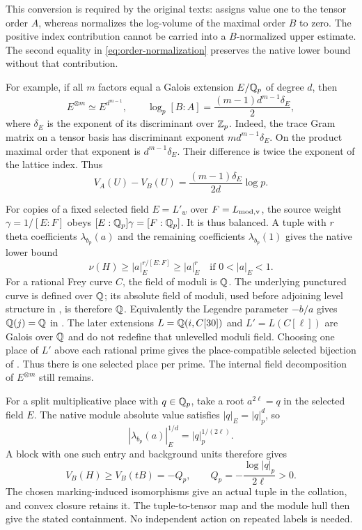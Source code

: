 This conversion is required by the original texts:
\cite[Section~9.10.3.1]{JoshiIII} assigns value one to the tensor order
$A$, whereas \cite[Proposition~1.4(i), author-version p.~13]{IUT4}
normalizes the log-volume of the maximal order $B$ to zero.
The positive index contribution cannot be carried into a $B$-normalized
upper estimate. The second equality in \eqref{eq:order-normalization}
preserves the native lower bound without that contribution.

For example, if all $m$ factors equal a Galois extension $E/\mathbb Q_p$ of
degree $d$, then
\[
 E^{\otimes m}\simeq E^{d^{m-1}},\qquad
 \log_p[B:A]=\frac{(m-1)d^{m-1}\delta_E}{2},
\]
where $\delta_E$ is the exponent of its discriminant over $\mathbb Z_p$.
Indeed, the trace Gram matrix on a tensor basis has discriminant exponent
$m d^{m-1}\delta_E$. On the product maximal order that exponent is
$d^{m-1}\delta_E$. Their difference is twice the exponent of the
lattice index. Thus
\[
 V_A(U)-V_B(U)=\frac{(m-1)\delta_E}{2d}\log p.
\]

For copies of a fixed selected field $E=L'_w$ over $F=L_{\rm mod,v}$,
the source weight $\gamma=1/[E:F]$ obeys
$[E:\mathbb Q_p]\gamma=[F:\mathbb Q_p]$. It is thus balanced. A tuple with $r$
theta coefficients $\lambda_{b_p}(a)$ and the remaining coefficients
$\lambda_{b_p}(1)$ gives the native lower bound
\[
 \nu(H)\ge |a|_E^{r/[E:F]}\ge |a|_E^r
 \quad\text{if }0<|a|_E<1.
\]
For a rational Frey curve $C$, the field of moduli is $\mathbb Q$.
The underlying punctured curve is defined over $\mathbb Q$; its absolute
field of moduli, used before adjoining level structure in
\cite[Section~3.1(4)]{JoshiIII}, is therefore $\mathbb Q$.
Equivalently the Legendre parameter $-b/a$ gives
$\mathbb Q(j)=\mathbb Q$ in \cite[Section~5.3]{JoshiIV}.
The later extensions $L=\mathbb Q(i,C[30])$ and $L'=L(C[\ell])$ are Galois
over $\mathbb Q$ and do not redefine that unlevelled moduli field.
Choosing one place of $L'$ above each rational prime gives the
place-compatible selected bijection of \cite[Section~3.3(14) and
Proposition~9.4.2.4(4)]{JoshiIII}. Thus there is one selected place per
prime. The internal field decomposition of $E^{\otimes m}$ still remains.

For a split multiplicative place with $q\in\mathbb Q_p$, take a root
$a^{2\ell}=q$ in the selected field $E$. The native module absolute value
satisfies $|q|_E=|q|_p^d$, so
\[
 |\lambda_{b_p}(a)|_E^{1/d}=|q|_p^{1/(2\ell)}.
\]
A block with one such entry and background units therefore gives
\begin{equation}\label{eq:native-point-lower}
 V_B(H)\ge V_B(tB)=-Q_p,\qquad Q_p=-\frac{\log|q|_p}{2\ell}>0.
\end{equation}
The chosen marking-induced isomorphisms give an actual tuple in the
collation, and convex closure retains it. The tuple-to-tensor map and
the module hull then give the stated containment. No independent action
on repeated labels is needed.

